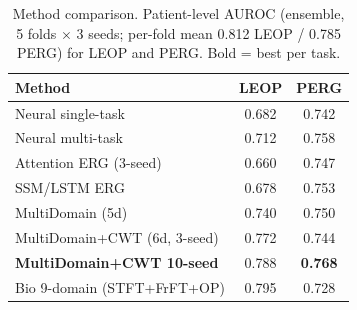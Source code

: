 \begin{table}[htbp]
\centering
\caption{Method comparison. Patient-level AUROC (ensemble, 5 folds $\times$ 3 seeds; per-fold mean 0.812 LEOP / 0.785 PERG) for LEOP and PERG. Bold = best per task.}
\label{tab:method-comparison}
\begin{tabular}{lcc}
\toprule
Method & LEOP & PERG \\
\midrule
Neural single-task & 0.682 & 0.742 \\
Neural multi-task & 0.712 & 0.758 \\
Attention ERG (3-seed) & 0.660 & 0.747 \\
SSM/LSTM ERG & 0.678 & 0.753 \\
MultiDomain (5d) & 0.740 & 0.750 \\
MultiDomain+CWT (6d, 3-seed) & 0.772 & 0.744 \\
\textbf{MultiDomain+CWT 10-seed} & 0.788 & \textbf{0.768} \\
Bio 9-domain (STFT+FrFT+OP) & 0.795 & 0.728 \\
\bottomrule
\end{tabular}
\end{table}
